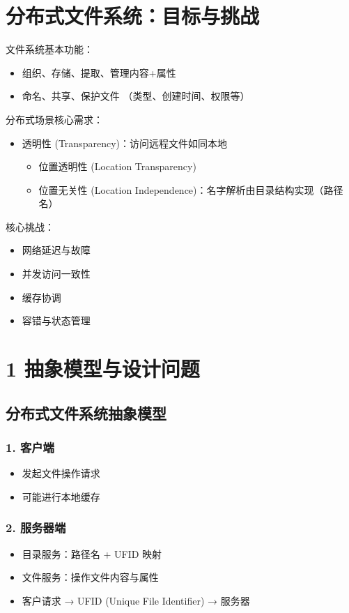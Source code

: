 \section{分布式文件系统：目标与挑战}

文件系统基本功能：
\begin{itemize}
    \item 组织、存储、提取、管理内容+属性
    \item 命名、共享、保护文件 （类型、创建时间、权限等）
\end{itemize}

分布式场景核心需求：
\begin{itemize}
    \item 透明性 (Transparency)：访问远程文件如同本地
    \begin{itemize}
        \item 位置透明性 (Location Transparency)
        \item 位置无关性 (Location Independence)：名字解析由目录结构实现（路径名）
    \end{itemize}
\end{itemize}

核心挑战：
\begin{itemize}
    \item 网络延迟与故障
    \item 并发访问一致性
    \item 缓存协调
    \item 容错与状态管理
\end{itemize}

\section{1 抽象模型与设计问题}

\subsection{分布式文件系统抽象模型}

\subsubsection{1. 客户端}
\begin{itemize}
    \item 发起文件操作请求
    \item 可能进行本地缓存
\end{itemize}

\subsubsection{2. 服务器端}
\begin{itemize}
    \item 目录服务：路径名 + UFID 映射
    \item 文件服务：操作文件内容与属性
    \item 客户请求 → UFID (Unique File Identifier) → 服务器
\end{itemize}

